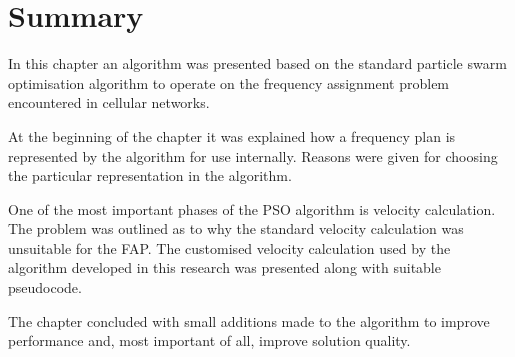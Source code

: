 \section{Summary}
In this chapter an algorithm was presented based on the standard particle swarm optimisation algorithm to operate on the frequency assignment problem encountered in cellular networks.

At the beginning of the chapter it was explained how a frequency plan is represented by the algorithm for use internally. Reasons were given for choosing the particular representation in the algorithm.

One of the most important phases of the \gls{PSO} algorithm is velocity calculation. The problem was outlined as to why the standard velocity calculation was unsuitable for the \gls{FAP}. The customised velocity calculation used by the algorithm developed in this research was presented along with suitable pseudocode.

The chapter concluded with small additions made to the algorithm to improve performance and, most important of all, improve solution quality.
